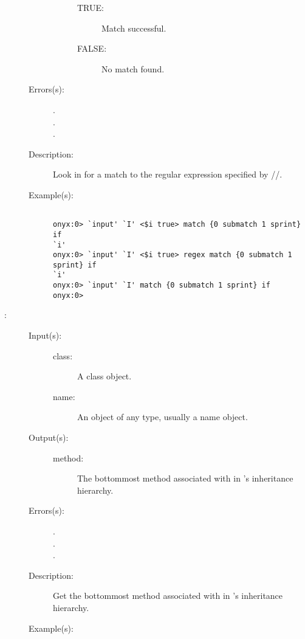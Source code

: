 \begin{description}
\begin{description}
\begin{description}
\begin{description}
			\item[TRUE: ] Match successful.
			\item[FALSE: ] No match found.
			\end{description}
		\end{description}
	\item[Errors(s): ]
		\begin{description}\item[]
		\item[.]
		\item[.]
		\item[.]
		\end{description}
	\item[Description: ]
		Look in  for a match to the regular expression
		specified by //.
	\item[Example(s): ]\begin{verbatim}

onyx:0> `input' `I' <$i true> match {0 submatch 1 sprint} if
`i'
onyx:0> `input' `I' <$i true> regex match {0 submatch 1 sprint} if
`i'
onyx:0> `input' `I' match {0 submatch 1 sprint} if
onyx:0>
		\end{verbatim}
	\end{description}
\label{systemdict:method}
\item[{\onyxop{class name}{method}{method}}: ]
	\begin{description}\item[]
	\item[Input(s): ]
		\begin{description}\item[]
		\item[class: ]
			A class object.
		\item[name: ]
			An object of any type, usually a name object.
		\end{description}
	\item[Output(s): ]
		\begin{description}\item[]
		\item[method: ]
			The bottommost method associated with  in
			's inheritance hierarchy.
		\end{description}
	\item[Errors(s): ]
		\begin{description}\item[]
		\item[.]
		\item[.]
		\item[.]
		\end{description}
	\item[Description: ]
		Get the bottommost method associated with  in
		's inheritance hierarchy.
	\item[Example(s): ]\begin{verbatim}


\end{verbatim}
\end{description}
\end{description}
